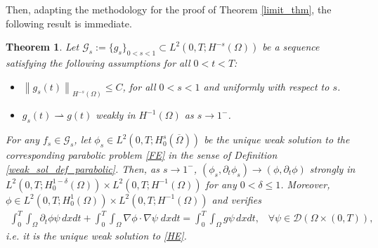 \documentclass[reqno,twoside]{amsart}
\newtheorem{theorem}{Theorem}[section]
\numberwithin{equation}{section}
\newcommand{\norm}[2]{{\left\|#1\right\|}_{#2}}
\begin{document}
Then, adapting the methodology for the proof of Theorem \eqref{limit_thm}, the following result is immediate.

\begin{theorem}\label{limit_thm_parabolic}
	Let $\mathcal{G}_s:=\{g_s\}_{0<s<1}\subset L^2(0,T;H^{-s}(\Omega))$ be a sequence satisfying the following assumptions for all $0<t<T$:
	\begin{itemize}
		\item[$\textbf{K1}$] $\norm{g_s(t)}{H^{-s}(\Omega)}\leq C$, for all $0<s<1$ and uniformly with respect to $s$.
		
		\item[$\textbf{K2}$] $g_s(t)\rightharpoonup g(t)$ weakly in $H^{-1}(\Omega)$ as $s\to 1^-$.
	\end{itemize}		
For any $f_s\in\mathcal{G}_s$, let $\phi_s\in L^2(0,T;H_0^s(\overline{\Omega}))$ be the unique weak solution to the corresponding parabolic problem \eqref{FE} in the sense of Definition \ref{weak_sol_def_parabolic}. Then, as $s\to 1^-$, $(\phi_s,\partial_t\phi_s)\to(\phi,\partial_t\phi)$ strongly in $L^2(0,T;H^{1-\delta}_0(\Omega))\times L^2(0,T;H^{-1}(\Omega))$ for any $0<\delta\leq 1$. Moreover, $\phi\in L^2(0,T;H^1_0(\Omega))\times L^2(0,T;H^{-1}(\Omega))$ and verifies
\begin{align*}
	\int_0^T \int_\Omega\partial_t\phi\psi\,dxdt + \int_0^T\int_\Omega \nabla\phi\cdot\nabla\psi\;dxdt = \int_0^T\int_\Omega g\psi\,dxdt, \;\;\; \forall\psi\in\mathcal{D}(\Omega\times(0,T)),
\end{align*}
i.e. it is the unique weak solution to \eqref{HE}.
\end{theorem}
\end{document}
